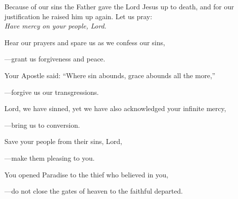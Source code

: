 \intercessions\indent

\begin{hangpar}

Because of our sins the Father gave the Lord Jesus up to death, and for our justification he raised him up again. Let us pray:\\
\emph{Have mercy on your people, Lord.}

\medskip Hear our prayers and spare us as we confess our sins,

{\color{red}---\thinspace}grant us forgiveness and peace.

\medskip Your Apostle said: “Where sin abounds, grace abounds all the more,”

{\color{red}---\thinspace}forgive us our transgressions.

\medskip Lord, we have sinned, yet we have also acknowledged your infinite mercy,

{\color{red}---\thinspace}bring us to conversion.

\medskip Save your people from their sins, Lord,

{\color{red}---\thinspace}make them pleasing to you.

\medskip You opened Paradise to the thief who believed in you,

{\color{red}---\thinspace}do not close the gates of heaven to the faithful departed.

\end{hangpar}

